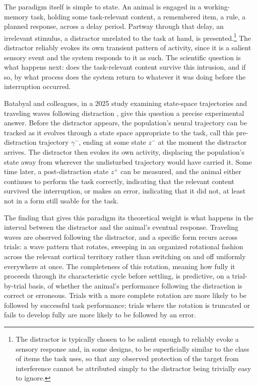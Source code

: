 \documentclass[11pt]{book}
\begin{document}
The paradigm itself is simple to state. An animal is engaged in a working-memory task, holding some task-relevant content, a remembered item, a rule, a planned response, across a delay period. Partway through that delay, an irrelevant stimulus, a distractor unrelated to the task at hand, is presented.\footnote{The distractor is typically chosen to be salient enough to reliably evoke a sensory response and, in some designs, to be superficially similar to the class of items the task uses, so that any observed protection of the target from interference cannot be attributed simply to the distractor being trivially easy to ignore.} The distractor reliably evokes its own transient pattern of activity, since it is a salient sensory event and the system responds to it as such. The scientific question is what happens next: does the task-relevant content survive this intrusion, and if so, by what process does the system return to whatever it was doing before the interruption occurred.

Batabyal and colleagues, in a 2025 study examining state-space trajectories and traveling waves following distraction \cite{batabyal2025}, give this question a precise experimental answer. Before the distractor appears, the population's neural trajectory can be tracked as it evolves through a state space appropriate to the task, call this pre-distraction trajectory $\gamma^{-}$, ending at some state $z^{-}$ at the moment the distractor arrives. The distractor then evokes its own activity, displacing the population's state away from wherever the undisturbed trajectory would have carried it. Some time later, a post-distraction state $z^{+}$ can be measured, and the animal either continues to perform the task correctly, indicating that the relevant content survived the interruption, or makes an error, indicating that it did not, at least not in a form still usable for the task.

The finding that gives this paradigm its theoretical weight is what happens in the interval between the distractor and the animal's eventual response. Traveling waves are observed following the distractor, and a specific form recurs across trials: a wave pattern that rotates, sweeping in an organized rotational fashion across the relevant cortical territory rather than switching on and off uniformly everywhere at once. The completeness of this rotation, meaning how fully it proceeds through its characteristic cycle before settling, is predictive, on a trial-by-trial basis, of whether the animal's performance following the distraction is correct or erroneous. Trials with a more complete rotation are more likely to be followed by successful task performance; trials where the rotation is truncated or fails to develop fully are more likely to be followed by an error.
\end{document}
